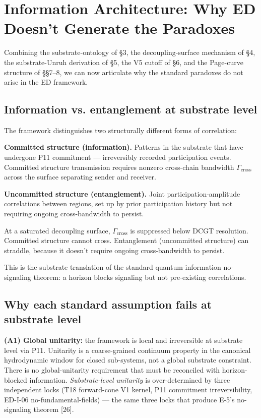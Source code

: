 \documentclass[11pt,a4paper]{article}
\begin{document}
\section{Information Architecture: Why ED Doesn't Generate the Paradoxes}

Combining the substrate-ontology of \S3, the decoupling-surface mechanism of \S4, the substrate-Unruh derivation of \S5, the V5 cutoff of \S6, and the Page-curve structure of \S\S7--8, we can now articulate why the standard paradoxes do not arise in the ED framework.

\subsection{Information vs. entanglement at substrate level}

The framework distinguishes two structurally different forms of correlation:

\textbf{Committed structure (information).} Patterns in the substrate that have undergone P11 commitment --- irreversibly recorded participation events. Committed structure transmission requires nonzero cross-chain bandwidth $\Gamma_{\mathrm{cross}}$ across the surface separating sender and receiver.

\textbf{Uncommitted structure (entanglement).} Joint participation-amplitude correlations between regions, set up by prior participation history but not requiring ongoing cross-bandwidth to persist.

At a saturated decoupling surface, $\Gamma_{\mathrm{cross}}$ is suppressed below DCGT resolution. Committed structure cannot cross. Entanglement (uncommitted structure) can straddle, because it doesn't require ongoing cross-bandwidth to persist.

This is the substrate translation of the standard quantum-information no-signaling theorem: a horizon blocks signaling but not pre-existing correlations.

\subsection{Why each standard assumption fails at substrate level}

\textbf{(A1) Global unitarity:} the framework is local and irreversible at substrate level via P11. Unitarity is a coarse-grained continuum property in the canonical hydrodynamic window for closed sub-systems, not a global substrate constraint. There is no global-unitarity requirement that must be reconciled with horizon-blocked information. \emph{Substrate-level unitarity} is over-determined by three independent locks (T18 forward-cone V1 kernel, P11 commitment irreversibility, ED-I-06 no-fundamental-fields) --- the same three locks that produce E-5's no-signaling theorem [26].
\end{document}
